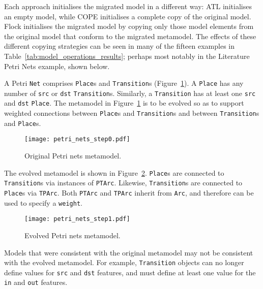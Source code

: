 Each approach initialises the migrated model in a different way: ATL initialises an empty model, while COPE initialises a complete copy of the original model. Flock initialises the migrated model by copying only those model elements from the original model that conform to the migrated metamodel. The effects of these different copying strategies can be seen in many of the fifteen examples in Table~\ref{tab:model_operations_results}; perhaps most notably in the Literature Petri Nets example, shown below.

A Petri \texttt{Net} comprises \texttt{Place}s and \texttt{Transition}s (Figure~\ref{fig:original_mm}). A \texttt{Place} has any number of \texttt{src} or \texttt{dst} \texttt{Transition}s. Similarly, a \texttt{Transition} has at least one \texttt{src} and \texttt{dst} \texttt{Place}. The metamodel in Figure~\ref{fig:original_mm} is to be evolved so as to support weighted connections between \texttt{Place}s and \texttt{Transition}s and between \texttt{Transition}s and \texttt{Place}s.

\begin{figure}[htbp]
  \centering
  \texttt{[image: petri\_nets\_step0.pdf]}
  \caption{Original Petri nets metamodel.}
  \label{fig:original_mm}
\end{figure}

The evolved metamodel is shown in Figure~\ref{fig:evolved_mm}. \texttt{Place}s are connected to \texttt{Transition}s via instances of \texttt{PTArc}. Likewise, \texttt{Transition}s are connected to \texttt{Place}s via \texttt{TPArc}. Both \texttt{PTArc} and \texttt{TPArc} inherit from \texttt{Arc}, and therefore can be used to specify a \texttt{weight}.

\begin{figure}[htbp]
  \centering
  \texttt{[image: petri\_nets\_step1.pdf]}
  \caption{Evolved Petri nets metamodel.}
  \label{fig:evolved_mm}
\end{figure}

Models that were consistent with the original metamodel may not be consistent with the evolved metamodel. For example, \texttt{Transition} objects can no longer define values for \texttt{src} and \texttt{dst} features, and must define at least one value for the \texttt{in} and \texttt{out} features.

